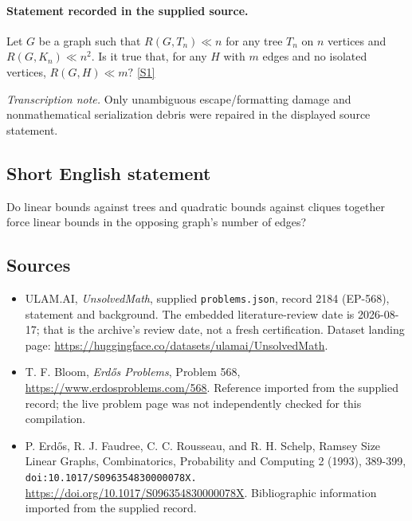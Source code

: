 \documentclass[11pt,a4paper]{article}
\newcommand{\sref}[2]{\hyperlink{source:#1:#2}{[S#2]}}
\begin{document}
\paragraph{Statement recorded in the supplied source.}
Let $G$ be a graph such that $R(G,T_n)\ll n$ for any tree $T_n$ on $n$ vertices and $R(G,K_n)\ll n^2$. Is it true that, for any $H$ with $m$ edges and no isolated vertices, $ R(G,H)\ll m? $ \sref{2184}{1}

{\small\emph{Transcription note.} Only unambiguous escape/formatting damage and nonmathematical serialization debris were repaired in the displayed source statement.}

\subsection{Short English statement}

Do linear bounds against trees and quadratic bounds against cliques together force linear bounds in the opposing graph's number of edges?

\subsection{Sources}

{\small

\begin{itemize}

\item[\hypertarget{source:2184:1}{S1}] ULAM.AI, \emph{UnsolvedMath}, supplied \texttt{problems.json}, record 2184 (EP-568), statement and background. The embedded literature-review date is 2026-08-17; that is the archive’s review date, not a fresh certification. Dataset landing page: \url{https://huggingface.co/datasets/ulamai/UnsolvedMath}.

\item[\hypertarget{source:2184:2}{S2}] T. F. Bloom, \emph{Erdős Problems}, Problem 568, \url{https://www.erdosproblems.com/568}. Reference imported from the supplied record; the live problem page was not independently checked for this compilation.

\item[\hypertarget{source:2184:3}{S3}] P. Erdős, R. J. Faudree, C. C. Rousseau, and R. H. Schelp, Ramsey Size Linear Graphs, Combinatorics, Probability and Computing 2 (1993), 389-399, \nolinkurl{doi:10.1017/S096354830000078X.} \url{https://doi.org/10.1017/S096354830000078X}. Bibliographic information imported from the supplied record.

\end{itemize}

}

\label{end:2184}
\end{document}
